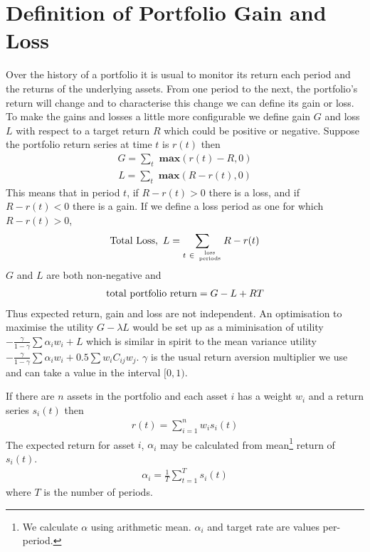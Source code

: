 \documentclass[12pt]{article}
\begin{document}
\section{Definition of Portfolio Gain and Loss}
Over the history of a portfolio it is usual to monitor its return each period and the returns of the underlying assets.
From one period to the next, the portfolio's return will change and to characterise this change we can define its gain or loss.
To make the gains and losses a little more configurable we define 
gain $G$ and loss $L$ with respect to a target return $R$ which could be positive or negative.
Suppose the portfolio return series at time $t$ is $r(t)$ then
\begin{eqnarray}
    G = \sum_t {\textbf{ max} }(r(t) - R,0)
\end{eqnarray}
\begin{eqnarray}
    L = \sum_t {\textbf{ max} }(R-r(t),0)
\end{eqnarray}
This means that in period $t$, if $R-r(t) > 0$ there is a loss, and if $R-r(t) < 0$ there is a gain.
If we define a loss period as one for which $R-r(t) > 0$,
\begin{eqnarray}
  {\rm Total\ Loss},\ L= \sum_{t\ \in\ \rm {loss\atop periods}} R-r(t)
\end{eqnarray}
$G$ and $L$ are both non-negative and
\begin{eqnarray}
 {\rm   total\ portfolio\ return}= G - L + RT
\end{eqnarray}
Thus expected return, gain and loss are not independent. An optimisation to maximise the utility $G- \lambda L$
would be set up as a miminisation of utility $-\frac{\gamma}{1-\gamma}\sum\alpha_i w_i + L$ which is 
similar in spirit to the mean variance utility $-\frac{\gamma}{1-\gamma}\sum\alpha_i w_i + 0.5 \sum w_i C_{ij}w_j$.
$\gamma$ is the usual return aversion multiplier we use and can take a value in the interval $[0,1)$.

If there are $n$ assets in the portfolio and each asset $i$
has a weight $w_i$ and a return series $s_i (t)$ then
\begin{eqnarray}
    r(t) = \sum_{i=1}^{n} w_i s_i(t)
\end{eqnarray}
The expected return for asset $i$, $\alpha_i$ may be calculated from
mean\footnote{We calculate $\alpha$ using arithmetic mean. $\alpha_i$ and target rate are values per-period.} 
return of $s_i(t)$.
\begin{eqnarray}
    \alpha_i =  \frac{1}{T}\sum_{t=1}^{T} s_i(t)
\end{eqnarray}
where $T$ is the number of periods.
\end{document}
